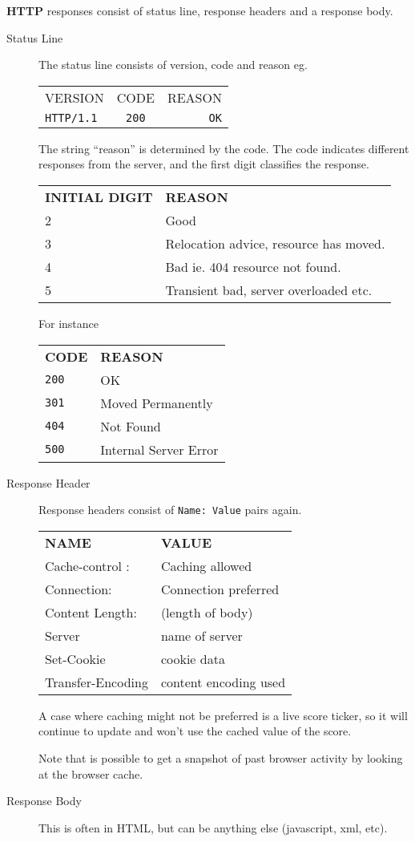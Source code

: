 \documentclass[11pt]{article}
\begin{document}
\textbf{HTTP} responses consist of status line, response headers and a response body.
\begin{description}
\item[Status Line]
The status line consists of version, code and reason
eg. 

\begin{tabular}{ l c r }
  VERSION & CODE & REASON \\
  \texttt{HTTP/1.1} & \texttt{200} & \texttt{OK} \\
\end{tabular}
The string ``reason'' is determined by the code. The code indicates different responses from the server, and the first digit classifies the response.

\begin{tabular}{ l l }
  \textbf{INITIAL DIGIT} & \textbf{REASON} \\
  2 & Good \\
  3 & Relocation advice, resource has moved. \\
  4 & Bad ie. 404 resource not found. \\
  5 & Transient bad, server overloaded etc. \\
\end{tabular}

For instance

\begin{tabular}{ l l }
  \textbf{CODE} & \textbf{REASON} \\
  \texttt{200} & OK  \\
  \texttt{301} & Moved Permanently  \\
  \texttt{404} & Not Found  \\
  \texttt{500} & Internal Server Error  \\
\end{tabular}
\item[Response Header]
Response headers consist of \texttt{Name: Value} pairs again.

\begin{tabular}{ l l }
  \textbf{NAME} & \textbf{VALUE}  \\
  Cache-control : & Caching allowed \\
  Connection: & Connection preferred \\
  Content Length: & (length of body) \\
  Server & name of server  \\
  Set-Cookie & cookie data  \\
  Transfer-Encoding & content encoding used  \\
\end{tabular}

A case where caching might not be preferred is a live score ticker, so it will continue to update and won’t use the cached value of the score.

Note that is possible to get a snapshot of past browser activity by looking at the browser cache.

\item[Response Body]
This is often in HTML, but can be anything else (javascript, xml, etc).
\end{description}
\end{document}
